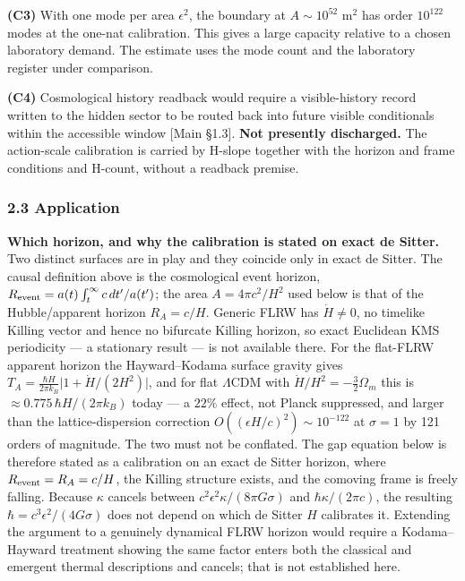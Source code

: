 \documentclass[
]{article}
\begin{document}
\textbf{(C3)} With one mode per area \(\epsilon^2\), the boundary at
\(A\sim10^{52}\) m\(^2\) has order \(10^{122}\) modes at the one-nat
calibration. This gives a large capacity relative to a chosen laboratory
demand. The estimate uses the mode count and the laboratory register
under comparison.

\textbf{(C4)} Cosmological history readback would require a
visible-history record written to the hidden sector to be routed back
into future visible conditionals within the accessible window {[}Main
§1.3{]}. \textbf{Not presently discharged.} The action-scale calibration
is carried by H-slope together with the horizon and frame conditions and
H-count, without a readback premise.

\hypertarget{application}{%
\subsubsection{2.3 Application}\label{application}}

\textbf{Which horizon, and why the calibration is stated on exact de
Sitter.} Two distinct surfaces are in play and they coincide only in
exact de Sitter. The causal definition above is the cosmological event
horizon, \(R_{\rm event}=a(t)\int_t^\infty c\,dt'/a(t')\); the area
\(A=4\pi c^2/H^2\) used below is that of the Hubble/apparent horizon
\(R_A=c/H\). Generic FLRW has \(\dot H\neq0\), no timelike Killing
vector and hence no bifurcate Killing horizon, so exact Euclidean KMS
periodicity --- a stationary result --- is not available there. For the
flat-FLRW apparent horizon the Hayward--Kodama surface gravity gives
\(T_A=\frac{\hbar H}{2\pi k_B}\big|1+\dot H/(2H^2)\big|\), and for flat
\(\Lambda\)CDM with \(\dot H/H^2=-\tfrac32\Omega_m\) this is
\(\approx0.775\,\hbar H/(2\pi k_B)\) today --- a \(22\%\) effect, not
Planck suppressed, and larger than the lattice-dispersion correction
\(O((\epsilon H/c)^2)\sim10^{-122}\) at \(\sigma = 1\) by 121 orders of
magnitude. The two must not be conflated. The gap equation below is
therefore stated as a calibration on an exact de Sitter horizon, where
\(R_{\rm event}=R_A=c/H\), the Killing structure exists, and the
comoving frame is freely falling. Because \(\kappa\) cancels between
\(c^2\epsilon^2\kappa/(8\pi G\sigma)\) and \(\hbar\kappa/(2\pi c)\), the
resulting \(\hbar=c^3\epsilon^2/(4G\sigma)\) does not depend on which de
Sitter \(H\) calibrates it. Extending the argument to a genuinely
dynamical FLRW horizon would require a Kodama--Hayward treatment showing
the same factor enters both the classical and emergent thermal
descriptions and cancels; that is not established here.
\end{document}
